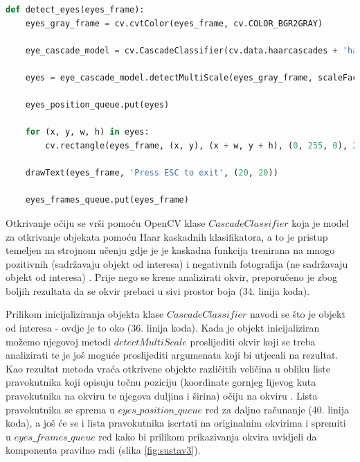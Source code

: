 \documentclass{foi}
\begin{document}
\begin{lstlisting}[language=Python, label={lst:lstlisting_9}, firstnumber=33, style=colored, caption={Definicija funkcije $detect\_eyes()$}]
def detect_eyes(eyes_frame):
    eyes_gray_frame = cv.cvtColor(eyes_frame, cv.COLOR_BGR2GRAY)

    eye_cascade_model = cv.CascadeClassifier(cv.data.haarcascades + 'haarcascade_eye.xml')

    eyes = eye_cascade_model.detectMultiScale(eyes_gray_frame, scaleFactor=1.1, minNeighbors=5, minSize=(30, 30))

    eyes_position_queue.put(eyes)

    for (x, y, w, h) in eyes:
        cv.rectangle(eyes_frame, (x, y), (x + w, y + h), (0, 255, 0), 2)

    drawText(eyes_frame, 'Press ESC to exit', (20, 20))

    eyes_frames_queue.put(eyes_frame)
\end{lstlisting}

Otkrivanje očiju se vrši pomoću OpenCV klase $CascadeClassifier$ koja je model za otkrivanje objekata pomoću Haar kaskadnih klasifikatora, a to je pristup temeljen na strojnom učenju gdje je je kaskadna funkcija trenirana na mnogo pozitivnih (sadržavaju objekt od interesa) i negativnih fotografija (ne sadržavaju objekt od interesa) \cite{OpenCV5}. Prije nego se krene analizirati okvir, preporučeno je zbog boljih rezultata da se okvir prebaci u sivi prostor boja (34. linija koda).

Prilikom inicijaliziranja objekta klase $CascadeClassifier$ navodi se što je objekt od interesa - ovdje je to oko (36. linija koda). Kada je objekt inicijaliziran možemo njegovoj metodi $detectMultiScale$ proslijediti okvir koji se treba analizirati te je još moguće proslijediti argumenata koji bi utjecali na rezultat. Kao rezultat metoda vraća otkrivene objekte različitih veličina u obliku liste pravokutnika koji opisuju točnu poziciju (koordinate gornjeg lijevog kuta pravokutnika na okviru te njegova duljina i širina) očiju na okviru \cite{OpenCV6}. Lista pravokutnika se sprema u $eyes\_position\_queue$ red za daljno računanje (40. linija koda), a još će se i lista pravokutnika iscrtati na originalnim okvirima i spremiti u $eyes\_frames\_queue$ red kako bi prilikom prikazivanja okvira uvidjeli da komponenta pravilno radi (slika \ref{fig:sustav3}).
\end{document}
